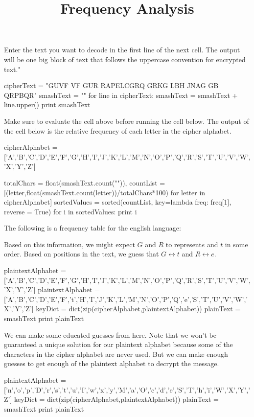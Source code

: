 \documentclass[handout]{ximera}
\title{Frequency Analysis}
\begin{document}
Enter the text you want to decode in the first line of the next cell.  The output will be one big block of text that follows the uppercase convention for encrypted text."

\begin{python}
cipherText = "GUVF VF GUR RAPELCGRQ GRKG LBH JNAG GB QRPBQR"
smashText =  ""
for line in cipherText:
	smashText = smashText + line.upper()
     	print smashText
\end{python}
Make sure to evaluate the cell above before running the cell below.  The output of the cell below is the relative frequency of each letter in the cipher alphabet.

\begin{python}
cipherAlphabet = ['A','B','C','D','E','F','G','H','I','J','K','L','M','N','O','P','Q','R','S','T','U','V','W','X','Y','Z']

totalChars = float(smashText.count("")),
countList = [(letter,float(smashText.count(letter))/totalChars*100) for letter in cipherAlphabet]
sortedValues = sorted(countList, key=lambda freq: freq[1], reverse = True)
for i in sortedValues:
	print i
\end{python}

The following is a frequency table for the english language:


Based on this information, we might expect $G$ and $R$ to represent$ e$ and $t$ in some order.  Based on positions in the text, we guess that $G \leftrightarrow t$ and $R \leftrightarrow e$.

\begin{python}
plaintextAlphabet = ['A','B','C','D','E','F','G','H','I','J','K','L','M','N','O','P','Q','R','S','T','U','V','W','X','Y','Z']
plaintextAlphabet = ['A','B','C','D','E','F','t','H','I','J','K','L','M','N','O','P','Q','e','S','T','U','V','W','X','Y','Z']
keyDict = dict(zip(cipherAlphabet,plaintextAlphabet))
plainText = smashText
print plainText
\end{python}

We can make some educated guesses from here. Note that we won't be guaranteed a unique solution for our plaintext alphabet because some of the characters in the cipher alphabet are never used.  But we can make enough guesses to get enough of the plaintext alphabet to decrypt the message.
  
\begin{python}
plaintextAlphabet = ['n','o','p','D','r','s','t','u','I','w','x','y','M','a','O','c','d','e','S','T','h','i','W','X','Y','Z']
keyDict = dict(zip(cipherAlphabet,plaintextAlphabet))
plainText = smashText
print plainText
\end{python}
\end{document}
